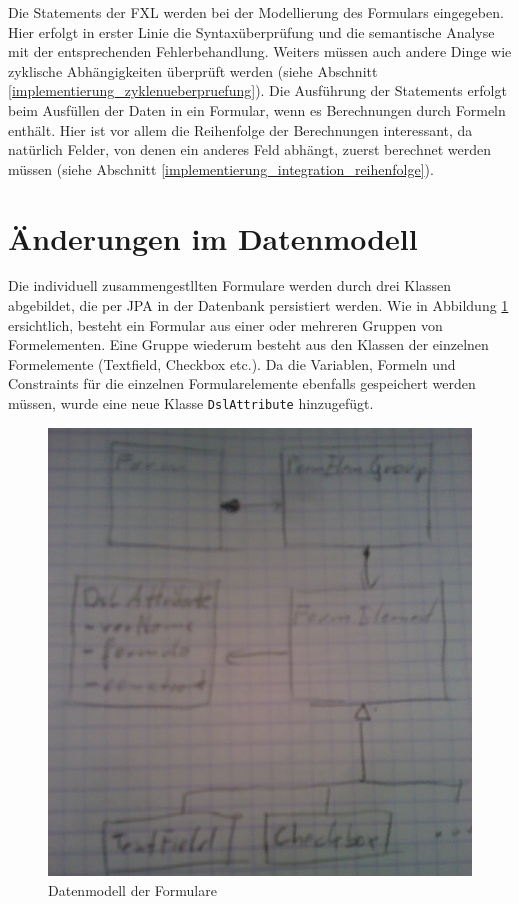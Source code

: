 Die Statements der FXL werden bei der Modellierung des Formulars eingegeben. Hier erfolgt in erster Linie die Syntaxüberprüfung und die semantische Analyse mit der entsprechenden Fehlerbehandlung. Weiters müssen auch andere Dinge wie zyklische Abhängigkeiten überprüft werden (siehe Abschnitt \ref{implementierung_zyklenueberpruefung}). Die Ausführung der Statements erfolgt beim Ausfüllen der Daten in ein Formular, wenn es Berechnungen durch Formeln enthält. Hier ist vor allem die Reihenfolge der Berechnungen interessant, da natürlich Felder, von denen ein anderes Feld abhängt, zuerst berechnet werden müssen (siehe Abschnitt \ref{implementierung_integration_reihenfolge}).



\section{Änderungen im Datenmodell}

Die individuell zusammengestllten Formulare werden durch drei Klassen abgebildet, die per JPA in der Datenbank persistiert werden. Wie in Abbildung \ref{abb_uml_datenmodell} ersichtlich, besteht ein Formular aus einer oder mehreren Gruppen von Formelementen. Eine Gruppe wiederum besteht aus den Klassen der einzelnen Formelemente (Textfield, Checkbox etc.). Da die Variablen, Formeln und Constraints für die einzelnen Formularelemente ebenfalls gespeichert werden müssen, wurde eine neue Klasse \texttt{DslAttribute} hinzugefügt.

\begin{figure}[ht]
\includegraphics[scale=0.3]{figures/uml_datenmodell}
\caption{Datenmodell der Formulare}
\label{abb_uml_datenmodell}
\end{figure}


